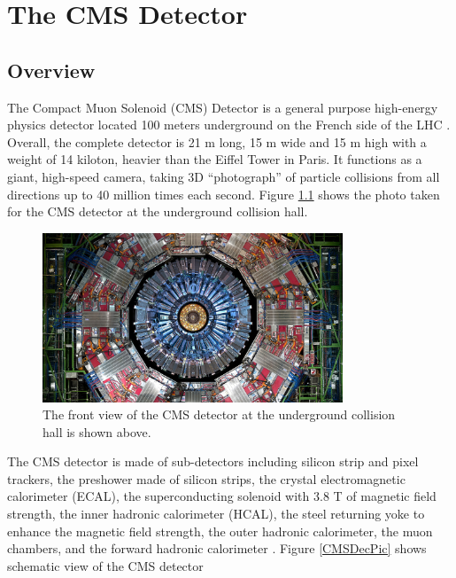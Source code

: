 \chapter{The CMS Detector}

\section{Overview}

The Compact Muon Solenoid (CMS) Detector is a general purpose high-energy physics detector located 100 meters underground on the French side of the LHC \cite{CMSDetector}. Overall, the complete detector is 21 m long, 15 m wide and 15 m high with a weight of 14 kiloton, heavier than the Eiffel Tower in Paris. It functions as a giant, high-speed camera, taking 3D ``photograph'' of particle collisions from all directions up to 40 million times each second. Figure \ref{CMSRealPic} shows the photo taken for the CMS detector at the underground collision hall.

\begin{figure}[hbtp]
\begin{center}
\includegraphics[width=0.80\textwidth]{Figures/Chapter2/CMSRealPic.jpg}
\caption{The front view of the CMS detector at the underground collision hall is shown above.}
\label{CMSRealPic}
\end{center}
\end{figure} 

The CMS detector is made of sub-detectors including silicon strip and pixel trackers, the preshower made of silicon strips, the crystal electromagnetic calorimeter (ECAL), the superconducting solenoid with 3.8 T of magnetic field strength, the inner hadronic calorimeter (HCAL), the steel returning yoke to enhance the magnetic field strength, the outer hadronic calorimeter, the muon chambers, and the forward hadronic calorimeter \cite{CMSDetector}. Figure \ref{CMSDecPic} shows schematic view of the CMS detector

